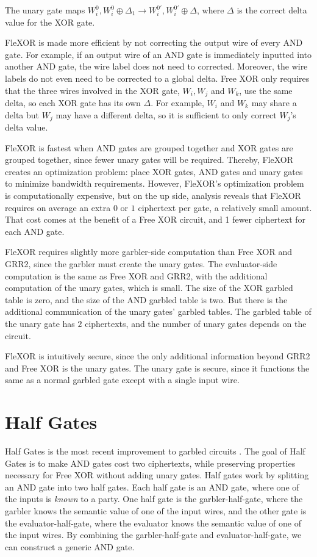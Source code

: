 The unary gate maps $W_i^0,W_i^0 \oplus \Delta_1 \to W_i^{0'}, W_i^{0'} \oplus \Delta$, where $\Delta$ is the correct delta value for the XOR gate.

FleXOR is made more efficient by not correcting the output wire of every AND gate.
For example, if an output wire of an AND gate is immediately inputted into another AND gate, the wire label does not need to corrected.
Moreover, the wire labels do not even need to be corrected to a global delta.
Free XOR only requires that the three wires involved in the XOR gate, $W_i, W_j$ and $W_k$, use the same delta, so each XOR gate has its own $\Delta$.
For example, $W_i$ and $W_k$ may share a delta but $W_j$ may have a different delta, so it is sufficient to only correct $W_j$'s delta value.

FleXOR is fastest when AND gates are grouped together and XOR gates are grouped together, since fewer unary gates will be required.
Thereby, FleXOR creates an optimization problem: place XOR gates, AND gates and unary gates to minimize bandwidth requirements.
However, FleXOR's optimization problem is computationally expensive, but on the up side, analysis reveals that FleXOR requires on average an extra $0$ or $1$ ciphertext per gate, a relatively small amount.
That cost comes at the benefit of a Free XOR circuit, and 1 fewer ciphertext for each AND gate.

FleXOR requires slightly more garbler-side computation than Free XOR and GRR2, since the garbler must create the unary gates.
The evaluator-side computation is the same as Free XOR and GRR2, with the additional computation of the unary gates, which is small.
The size of the XOR garbled table is zero, and the size of the AND garbled table is two.
But there is the additional communication of the unary gates' garbled tables.
The garbled table of the unary gate has $2$ ciphertexts, and the number of unary gates depends on the circuit.

FleXOR is intuitively secure, since the only additional information beyond GRR2 and Free XOR is the unary gates.
The unary gate is secure, since it functions the same as a normal garbled gate except with a single input wire.

\section{Half Gates}
Half Gates is the most recent improvement to garbled circuits \cite{twohalves}.
The goal of Half Gates is to make AND gates cost two ciphertexts, while preserving properties necessary for Free XOR without adding unary gates. 
Half gates work by splitting an AND gate into two half gates.
Each half gate is an AND gate, where one of the inputs is \textit{known} to a party.
One half gate is the garbler-half-gate, where the garbler knows the semantic value of one of the input wires, and the other gate is the evaluator-half-gate, where the evaluator knows the semantic value of one of the input wires.
By combining the garbler-half-gate and evaluator-half-gate, we can construct a generic AND gate.

